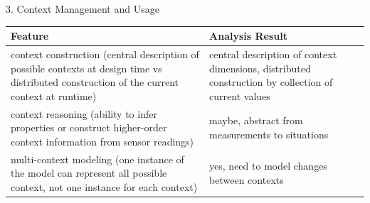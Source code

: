  3. Context Management and Usage \\
\newline
\begin{tabularx}{\textwidth}{|X|X|}
\hline
\textbf{Feature} & \textbf{Analysis Result} \\
\hline 
context construction (central description of possible contexts at design time vs distributed construction of the current context at runtime) &  central description of context dimensions, distributed construction by collection of current values \\ 
\hline 
context reasoning (ability to infer properties or construct higher-order context information from sensor readings) & maybe, abstract from measurements to situations \\ 
\hline 
multi-context modeling (one instance of the model can represent all possible context, not one instance for each context) & yes, need to model changes between contexts \\ 
\hline 
\end{tabularx} 

